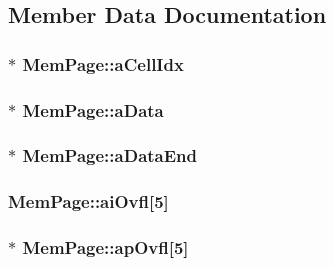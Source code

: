 \subsection{Member Data Documentation}
\hypertarget{struct_mem_page_a6f391f110e68ede6e5234b4e9f678f99}{
\subsubsection[{a\-Cell\-Idx}]{$\ast$ Mem\-Page\-::a\-Cell\-Idx}}\label{struct_mem_page_a6f391f110e68ede6e5234b4e9f678f99}
\hypertarget{struct_mem_page_a2d873eff563d2208be0c24959140a4b0}{
\subsubsection[{a\-Data}]{$\ast$ Mem\-Page\-::a\-Data}}\label{struct_mem_page_a2d873eff563d2208be0c24959140a4b0}
\hypertarget{struct_mem_page_ab5d2ecb95a84eaf4bd0ccef536bac6d7}{
\subsubsection[{a\-Data\-End}]{$\ast$ Mem\-Page\-::a\-Data\-End}}\label{struct_mem_page_ab5d2ecb95a84eaf4bd0ccef536bac6d7}
\hypertarget{struct_mem_page_a857e00533053fe6017c6e08b1b240661}{
\subsubsection[{ai\-Ovfl}]{ Mem\-Page\-::ai\-Ovfl\mbox{[}5\mbox{]}}}\label{struct_mem_page_a857e00533053fe6017c6e08b1b240661}
\hypertarget{struct_mem_page_a3a6347d06b1e85938605d9a44f193cb9}{
\subsubsection[{ap\-Ovfl}]{$\ast$ Mem\-Page\-::ap\-Ovfl\mbox{[}5\mbox{]}}}\label{struct_mem_page_a3a6347d06b1e85938605d9a44f193cb9}
